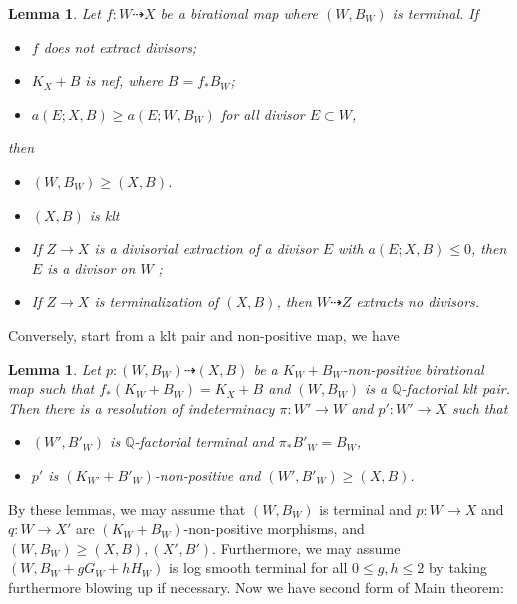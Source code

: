 \documentclass{article}
\newtheorem{lem}[defn]{Lemma}
\begin{document}
\begin{lem}
Let $f:W\dashrightarrow X$ be a birational map where $(W,B_W)$ is terminal. If
\begin{itemize}
  \item $f$ does not extract divisors;
  \item $K_X+B$ is nef, where $B=f_*B_W$;
  \item $a(E;X,B)\geqslant a(E;W,B_W)$ for all divisor $E \subset W$,
\end{itemize}
then
\begin{itemize}
  \item $(W,B_W)\geqslant (X,B)$.
  \item $(X,B)$ is klt
  \item If $Z\to X$ is a divisorial extraction of a divisor $E$ with $a(E;X,B)\leqslant 0$, then $E$ is a divisor on $W$ ;
  \item If $Z\to X$ is terminalization of $(X,B)$, then $W\dashrightarrow Z$ extracts no divisors.
\end{itemize}
\end{lem}
Conversely, start from a klt pair and non-positive map, we have
\begin{lem}
Let $p:(W,B_W)\dashrightarrow (X,B)$ be a $K_W+B_W$-non-positive birational map such that $f_*(K_W+B_W)=K_X+B$ and $(W,B_W)$ is a $\mathbb{Q}$-factorial klt pair. Then there is a resolution of indeterminacy $\pi:W'\to W $ and $p':W'\to X$ such that
\begin{itemize}
  \item $(W',B'_W)$ is $\mathbb{Q}$-factorial terminal and $\pi_*B'_W=B_W$,
  \item $p'$ is $(K_{W'}+B'_W)$-non-positive and $(W',B'_W)\geqslant (X,B)$.
\end{itemize}
\end{lem}
By these lemmas, we may assume that $(W,B_W)$ is terminal and $p:W\to X$ and $q:W\to X'$ are $(K_W+B_W)$-non-positive morphisms, and $(W,B_W)\geqslant (X,B),(X',B')$. Furthermore, we may assume $(W,B_W+gG_W+hH_W)$ is log smooth terminal for all $0\leqslant g,h\leqslant 2$ by taking furthermore blowing up if necessary. Now we have second form of Main theorem:
\end{document}

